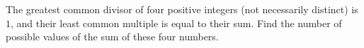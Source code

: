 The greatest common divisor of four positive integers (not necessarily distinct) is $1$, and their least common multiple is equal to their sum. Find the number of possible values of the sum of these four numbers.
